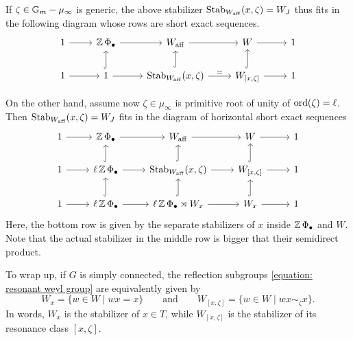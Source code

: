 If $\zeta \in \mathbb{G}_m - \mu_{\infty}$ is generic, the above stabilizer $\operatorname{Stab}_{W_{\mathrm{aff}}}(x, \zeta) = W_J$ thus fits in the following diagram whose rows are short exact sequences.
\begin{equation}\label{equation: stabilizer exact sequences for zeta generic}
    \begin{tikzcd}
        1 \arrow[r] & \Z\Phi_{\bullet} \arrow[r] & W_{\aff} \arrow[r] & W \arrow[r] & 1 \\
        1 \arrow[r] & 1 \arrow[r] \arrow[u, hook] & \Stab_{W_{\aff}}(x, \zeta) \arrow[r , "="] \arrow[u, hook] & W_{[x, \zeta]} \arrow[r] \arrow[u, hook] & 1
    \end{tikzcd}
\end{equation}

On the other hand, assume now $\zeta \in \mu_{\infty}$ is primitive root of unity of $\mathrm{ord}(\zeta) = \ell$. Then $\operatorname{Stab}_{W_{\mathrm{aff}}}(x, \zeta) = W_J$ fits in the diagram of horizontal short exact sequences
\begin{equation}\label{equation: stabilizer exact sequences for zeta root of unity}
    \begin{tikzcd}
        1 \arrow[r] & \Z\Phi_{\bullet} \arrow[r] & W_{\aff} \arrow[r] & W \arrow[r] & 1 \\
        1 \arrow[r]& \ell \Z\Phi_{\bullet} \arrow[r] \arrow[u, hook] & \Stab_{W_{\aff}}(x, \zeta) \arrow[r] \arrow[u, hook] & W_{[x, \zeta]} \arrow[r] \arrow[u, hook] & 1 \\
        1 \arrow[r]  & \ell \Z\Phi_{\bullet} \arrow[r] \arrow[u, hook] & \ell \Z\Phi_{\bullet} \rtimes W_{x} \arrow[r] \arrow[u, hook] & W_{x} \arrow[r] \arrow[u, hook] & 1 
    \end{tikzcd}
\end{equation}
Here, the bottom row is given by the separate stabilizers of $x$ inside $\operatorname{\mathbb{Z}}\Phi_{\bullet}$ and $W$. Note that the actual stabilizer in the middle row is bigger that their semidirect product.



To wrap up, if $G$ is simply connected, the reflection subgroups \eqref{equation: resonant weyl group} are equivalently given by
\begin{equation}\label{eq: weyl group and resonant weyl group}
   W_x = \{w \in W \mid wx = x\} 
   \qquad \text{and} \qquad  
   W_{[x, \zeta]} = \{w \in W \mid wx \sim_{\zeta} x\}.
\end{equation}
In words, $W_x$ is the stabilizer of $x \in T$, while $W_{[x, \zeta]}$ is the stabilizer of its resonance class $[x, \zeta]$.     







